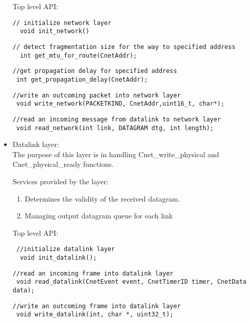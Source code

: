 \documentclass{book}
\begin{document}
\begin{itemize}
    Top level API:
		
   \begin{lstlisting}
// initialize network layer
  void init_network()	
\end{lstlisting} 
   
   		
   		\begin{lstlisting}
// detect fragmentation size for the way to specified address
  int get_mtu_for_route(CnetAddr);
\end{lstlisting}
	
	
	\begin{lstlisting}
//get propagation delay for specified address
 int get_propagation_delay(CnetAddr);
\end{lstlisting}
	

\begin{lstlisting}
//write an outcoming packet into network layer
 void write_network(PACKETKIND, CnetAddr,uint16_t, char*);
\end{lstlisting}
	

\begin{lstlisting}
//read an incoming message from datalink to network layer
 void read_network(int link, DATAGRAM dtg, int length);
\end{lstlisting}
	
    	    	
\item	Datalink layer: \\
		The purpose of this layer is in handling Cnet\_write\_physical and
		Cnet\_physical\_ready functions. 
		
		Services provided by the layer:
    \begin{enumerate}
      \item Determines the validity of the received datagram.
      \item Managing output datagram queue for each link 
    \end{enumerate}
		
		Top level API:

    
  \begin{lstlisting}
 //initialize datalink layer
  void init_datalink();
\end{lstlisting}
 
	\begin{lstlisting}
//read an incoming frame into datalink layer
 void read_datalink(CnetEvent event, CnetTimerID timer, CnetData data);
\end{lstlisting}
  

\begin{lstlisting}
//write an outcoming frame into datalink layer
 void write_datalink(int, char *, uint32_t);
\end{lstlisting} 
 


\end{itemize}
\end{document}
